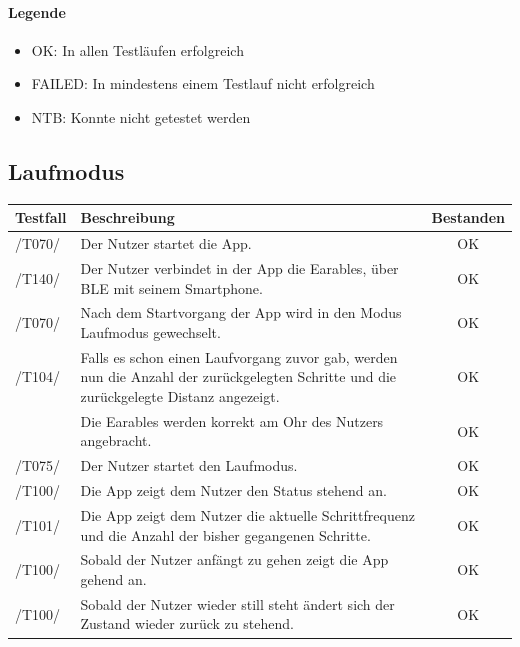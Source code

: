 \documentclass[a4paper,12pt]{article}
\newcommand{\testok}[0]{
	\cellcolor{green!25} OK
}
\begin{document}
\paragraph{Legende} 
\begin{itemize}
	\item OK: In allen Testläufen erfolgreich
	\item FAILED: In mindestens einem Testlauf nicht erfolgreich
	\item NTB: Konnte nicht getestet werden
\end{itemize}
\clearpage
\subsection{Laufmodus}
\begin{tabular}{ |p{1.5cm} | p{12cm} | c| }
	\hline
	\textbf{Testfall} & \textbf{Beschreibung} & \textbf{Bestanden}\\
	\hline
	/T070/ & Der Nutzer startet die App. & \testok \\
	\hline
	/T140/ & Der Nutzer verbindet in der App die Earables, über BLE mit seinem Smartphone. & \testok \\
	\hline
	/T070/ & Nach dem Startvorgang der App wird in den Modus \glqq Laufmodus\grqq{} gewechselt. & \testok \\
	\hline
	/T104/ & Falls es schon einen Laufvorgang zuvor gab, werden nun die Anzahl der zurückgelegten Schritte und die zurückgelegte Distanz angezeigt.& \testok \\
	\hline
	& Die Earables werden korrekt am Ohr des Nutzers angebracht. & \testok \\
	\hline
	/T075/ & Der Nutzer startet den Laufmodus. & \testok \\
	\hline
	/T100/ & Die App zeigt dem Nutzer den Status \glqq stehend\grqq{} an. & \testok \\
	\hline
	/T101/ & Die App zeigt dem Nutzer die aktuelle Schrittfrequenz und die Anzahl der bisher gegangenen Schritte. & \testok \\
	\hline
	/T100/ & Sobald der Nutzer anfängt zu gehen zeigt die App \glqq gehend\grqq{} an. & \testok \\
	\hline
	/T100/ & Sobald der Nutzer wieder still steht ändert sich der Zustand wieder zurück zu \glqq stehend\grqq. & \testok \\
	\hline	
\end{tabular}
\end{document}
